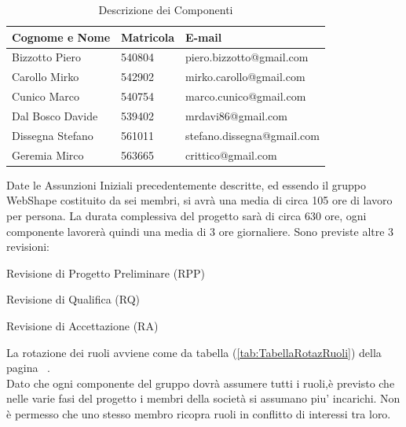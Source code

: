 \begin{table}[h]
	\begin{center}
		  \begin{tabular}{|p{}|l|l|}
		 \hline 
		 \textbf{Cognome e Nome} & \textbf{Matricola} & \textbf{E-mail}\\
		 \hline
		Bizzotto Piero & 540804 & piero.bizzotto@gmail.com \\
		Carollo Mirko & 542902 & mirko.carollo@gmail.com\\
		Cunico Marco & 540754 & marco.cunico@gmail.com\\
		Dal Bosco Davide & 539402 & mrdavi86@gmail.com\\
		Dissegna Stefano & 561011 & stefano.dissegna@gmail.com \\
		Geremia Mirco & 563665 & crittico@gmail.com\\
		\hline
		\end{tabular}
	\caption{Descrizione dei Componenti} 
	\label{tab:tabella_componenti}
	\end{center}	
\end{table}



Date le Assunzioni Iniziali precedentemente descritte, ed essendo il gruppo WebShape costituito da sei membri, si avr\`a una media di circa 105 ore di lavoro per persona. La durata complessiva del progetto sar\`a di circa 630 ore, ogni componente lavorer\`a quindi una media di 3 ore giornaliere. Sono previste altre 3 revisioni:
\begin{elenconumerato}{\normindent}
				\item Revisione di Progetto Preliminare (RPP)
				\item Revisione di Qualifica (RQ)
				\item Revisione di Accettazione (RA)
			\end{elenconumerato}
La rotazione dei ruoli avviene come da tabella (\ref{tab:TabellaRotazRuoli}) della pagina ~\pageref{tab:TabellaRotazRuoli}.\\
Dato che ogni componente del gruppo dovr\`a assumere tutti i ruoli,\`e previsto che nelle varie fasi del progetto i membri della societ\`a si assumano piu' incarichi. Non \`e permesso che uno stesso membro ricopra ruoli in conflitto di interessi tra loro.\\

